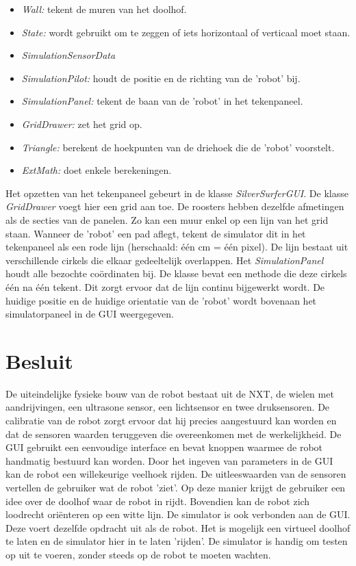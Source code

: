 \documentclass[tt3]{penoverslag}
\begin{document}
\begin{itemize}
\item \textit{Wall:} tekent de muren van het doolhof.
\item \textit{State:} wordt gebruikt om te zeggen of iets horizontaal of verticaal moet staan.
\item \textit{SimulationSensorData}
\item \textit{SimulationPilot:} houdt de positie en de richting van de 'robot' bij.
\item \textit{SimulationPanel:} tekent de baan van de 'robot' in het tekenpaneel.
\item \textit{GridDrawer:} zet het grid op.
\item \textit{Triangle:} berekent de hoekpunten van de driehoek die de 'robot' voorstelt.
\item \textit{ExtMath:} doet enkele berekeningen.
\end{itemize}

Het opzetten van het tekenpaneel gebeurt in de klasse \textit{SilverSurferGUI}. De klasse \textit{GridDrawer} voegt hier een grid aan toe. De roosters hebben dezelfde afmetingen als de secties van de panelen. Zo kan een muur enkel op een lijn van het grid staan.
Wanneer de 'robot' een pad aflegt, tekent de simulator dit in het tekenpaneel als een rode lijn (herschaald: \'e\'en cm = \'e\'en pixel). De lijn  bestaat uit verschillende cirkels die elkaar gedeeltelijk overlappen. Het \textit{SimulationPanel} houdt alle bezochte co\"ordinaten bij. De klasse bevat een methode die deze cirkels \'e\'en na \'e\'en tekent. Dit zorgt ervoor dat de lijn continu bijgewerkt wordt. De huidige positie en de huidige orientatie van de 'robot' wordt bovenaan het simulatorpaneel in de GUI weergegeven.

\section{Besluit} %
\label{sec:besl}
De uiteindelijke fysieke bouw van de robot bestaat uit de NXT, de wielen met aandrijvingen, een ultrasone sensor, een lichtsensor en twee druksensoren.
De calibratie van de robot zorgt ervoor dat hij precies aangestuurd kan worden en dat de sensoren waarden teruggeven die overeenkomen met de werkelijkheid.
De GUI gebruikt een eenvoudige interface en bevat knoppen waarmee de robot handmatig bestuurd kan worden. Door het ingeven van parameters in de GUI kan de robot een willekeurige veelhoek rijden. De uitleeswaarden van de sensoren vertellen de gebruiker wat de robot 'ziet'. Op deze manier krijgt de gebruiker een idee over de doolhof waar de robot in rijdt. Bovendien kan de robot zich loodrecht ori\"enteren op een witte lijn. De simulator is ook verbonden aan de GUI. Deze voert dezelfde opdracht uit als de robot. Het is mogelijk een virtueel doolhof te laten en de simulator hier in te laten 'rijden'. De simulator is handig om testen op uit te voeren, zonder steeds op de robot te moeten wachten.
\end{document}
